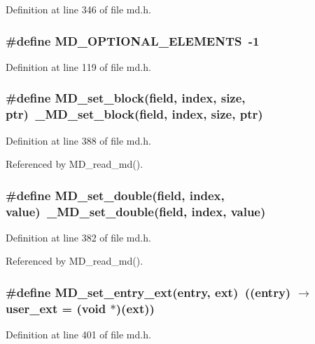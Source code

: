 Definition at line 346 of file md.h.
\subsubsection{\setlength{\rightskip}{0pt plus 5cm}\#define MD\_\-OPTIONAL\_\-ELEMENTS~-1}\label{md_8h_c15a807bd62acbd79af8b6023c59cef9}




Definition at line 119 of file md.h.
\subsubsection{\setlength{\rightskip}{0pt plus 5cm}\#define MD\_\-set\_\-block(field, index, size, ptr)~\_\-MD\_\-set\_\-block(field, index, size, ptr)}\label{md_8h_30362daccaa98444f1e578c99d7b9c7f}




Definition at line 388 of file md.h.

Referenced by MD\_\-read\_\-md().
\subsubsection{\setlength{\rightskip}{0pt plus 5cm}\#define MD\_\-set\_\-double(field, index, value)~\_\-MD\_\-set\_\-double(field, index, value)}\label{md_8h_c47e98c68b31487a4b7958ca8be2f337}




Definition at line 382 of file md.h.

Referenced by MD\_\-read\_\-md().
\subsubsection{\setlength{\rightskip}{0pt plus 5cm}\#define MD\_\-set\_\-entry\_\-ext(\bf{entry}, ext)~((\bf{entry}) $\rightarrow$ user\_\-ext = (void $\ast$)(ext))}\label{md_8h_12db2a7c7d8e148e52ce59f2cbecdcff}




Definition at line 401 of file md.h.
